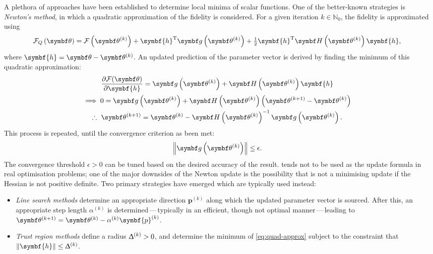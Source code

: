 A plethora of approaches have been established to determine local minima of
scalar functions. One of the better-known strategies is \emph{Newton's method},
in which a quadratic approximation of the fidelity is considered.
For a given iteration $k \in \mathbb{N}_0$, the fidelity is approximated using
\begin{equation}
    \FQth =
        \Fthk +
        \symbf{h}\T \bdgthk +
        \tfrac{1}{2} \symbf{h}^{\mathrm{T}} \bdHthk \symbf{h},
    \label{eq:quad-approx}
\end{equation}
where $\symbf{h} = \bth - \bthk$.  An updated prediction of the parameter
vector is derived by finding the minimum of this quadratic approximation:
\begin{gather}
    \frac{\partial \Fth}{\partial \symbf{h}} =
        \bdgthk + \bdHthk \symbf{h} \notag\\
    \implies 0 = \bdgthk + \bdHthk \left(\bthkplusone - \bthk\right) \notag\\
    \therefore\ \bthkplusone =
        \bthk - \bdHthk^{-1}
        \bdgthk.\label{eq:newton-update}
\end{gather}
This process is repeated, until the convergence criterion as been met:
\begin{equation}
    \left\lVert \bdgthk \right\rVert \leq \epsilon.
\end{equation}
The convergence threshold $\epsilon > 0$ can be tuned based on the desired
accuracy of the result.
 tends not to be used as the update formula in real
optimisation problems; one of the major downsides of the Newton update is the
possibility that is not a minimising update if the Hessian is not positive
definite. Two primary strategies have emerged which are typically used instead:
\begin{itemize}
    \item \emph{Line search methods}\cite[Chapter 3]{Nocedal2006} determine an
        appropriate direction $\symbf{p}^{(k)}$ along which the updated
        parameter vector is sourced.  After this, an appropriate step length
        $\alpha^{(k)}$ is determined\,---\,typically in an efficient, though not
        optimal manner\,---\,leading to $\bthkplusone = \bthk - \alpha^{(k)}\symbf{p}^{(k)}$.
    \item \emph{Trust region methods}\cite[Chapter 4]{Nocedal2006} define a
        radius $\Updelta^{(k)} > 0$, and determine the minimum of
        \cref{eq:quad-approx} subject to the constraint that
        $\left\lVert\symbf{h}\right\rVert \leq \Updelta^{(k)}$.
\end{itemize}


